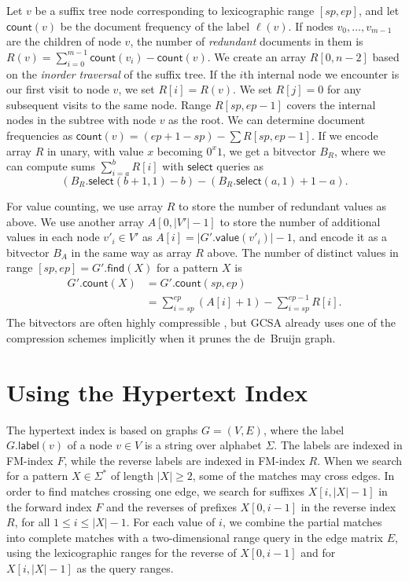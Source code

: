\documentclass[twoside,leqno,twocolumn]{article}
\newcommand{\abs}[1]{\ensuremath{\lvert #1 \rvert}}
\newcommand{\select}{\ensuremath{\mathsf{select}}}
\newcommand{\find}{\ensuremath{\mathsf{find}}}
\newcommand{\countq}{\ensuremath{\mathsf{count}}}
\newcommand{\glabel}{\ensuremath{\mathsf{label}}}
\newcommand{\gvalue}{\ensuremath{\mathsf{value}}}
\begin{document}
Let $v$ be a suffix tree node corresponding to lexicographic range $[sp, ep]$, and let $\countq(v)$ be the document frequency of the label $\ell(v)$. If nodes $v_{0}, \dotsc, v_{m-1}$ are the children of node $v$, the number of \emph{redundant} documents in them is $R(v) = \sum_{i=0}^{m-1} \countq(v_{i}) - \countq(v)$. We create an array $R[0, n-2]$ based on the \emph{inorder traversal} of the suffix tree. If the $i$th internal node we encounter is our first visit to node $v$, we set $R[i] = R(v)$. We set $R[j] = 0$ for any subsequent visits to the same node. Range $R[sp, ep-1]$ covers the internal nodes in the subtree with node $v$ as the root. We can determine document frequencies as $\countq(v) = (ep+1-sp) - \sum R[sp, ep-1]$. If we encode array $R$ in unary, with value $x$ becoming $0^{x} 1$, we get a bitvector $B_{R}$, where we can compute sums $\sum_{i=a}^{b} R[i]$ with $\select$ queries as
$$
(B_{R}.\select(b+1, 1) - b) - (B_{R}.\select(a, 1) + 1 - a).
$$

For value counting, we use array $R$ to store the number of redundant values as above. We use another array $A[0, \abs{V'}-1]$ to store the number of additional values in each node $v'_{i} \in V'$ as $A[i] = \abs{G'.\gvalue(v'_{i})}-1$, and encode it as a bitvector $B_{A}$ in the same way as array $R$ above. The number of distinct values in range $[sp,ep] = G'.\find(X)$ for a pattern $X$ is
\begin{align*}
G'.\countq(X) & = G'.\countq(sp, ep) \\
 & = \sum_{i = sp}^{ep} (A[i] + 1) - \sum_{i = sp}^{ep - 1} R[i].
\end{align*}
The bitvectors are often highly compressible \cite{Gagie2015}, but GCSA already uses one of the compression schemes implicitly when it prunes the de~Bruijn graph.


\section{Using the Hypertext Index}\label{appendix:hypertext}

The hypertext index \cite{Thachuk2013} is based on graphs $G = (V, E)$, where the label $G.\glabel(v)$ of a node $v \in V$ is a string over alphabet $\Sigma$. The labels are indexed in FM\nobreakdash-index $F$, while the reverse labels are indexed in FM\nobreakdash-index $R$. When we search for a pattern $X \in \Sigma^{\ast}$ of length $\abs{X} \ge 2$, some of the matches may cross edges. In order to find matches crossing one edge, we search for suffixes $X[i, \abs{X}-1]$ in the forward index $F$ and the reverses of prefixes $X[0, i-1]$ in the reverse index $R$, for all $1 \le i \le \abs{X}-1$. For each value of $i$, we combine the partial matches into complete matches with a two-dimensional range query in the edge matrix $E$, using the lexicographic ranges for the reverse of $X[0, i-1]$ and for $X[i, \abs{X}-1]$ as the query ranges.
\end{document}
